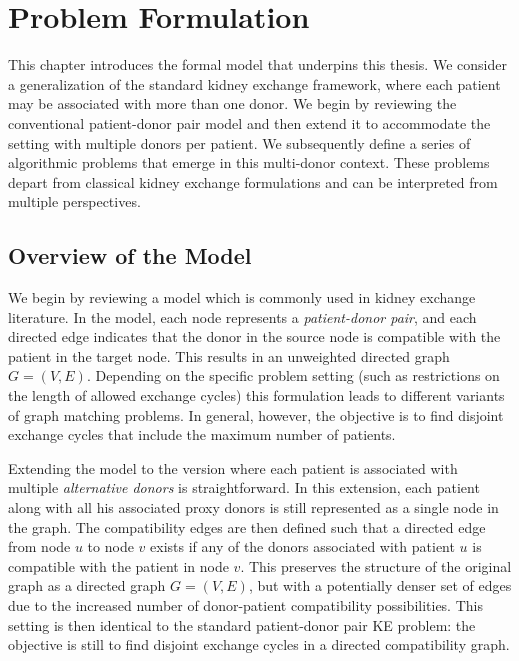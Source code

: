 \chapter{Problem Formulation}
\label{cha:problem_formulation}

This chapter introduces the formal model that underpins this thesis. We consider a generalization of the standard kidney exchange framework, where each patient may be associated with more than one donor. We begin by reviewing the conventional patient-donor pair model and then extend it to accommodate the setting with multiple donors per patient. We subsequently define a series of algorithmic problems that emerge in this multi-donor context. These problems depart from classical kidney exchange formulations and can be interpreted from multiple perspectives.%

\section{Overview of the Model}

We begin by reviewing a model which is commonly used in kidney exchange literature. In the model, each node represents a \textit{patient-donor pair}, and each directed edge indicates that the donor in the source node is compatible with the patient in the target node. This results in an unweighted directed graph $G = (V, E)$. Depending on the specific problem setting (such as restrictions on the length of allowed exchange cycles) this formulation leads to different variants of graph matching problems. In general, however, the objective is to find disjoint exchange cycles that include the maximum number of patients.

Extending the model to the version where each patient is associated with multiple \textit{alternative donors} is straightforward. In this extension, each patient along with all his associated proxy donors is still represented as a single node in the graph. The compatibility edges are then defined such that a directed edge from node $u$ to node $v$ exists if any of the donors associated with patient $u$ is compatible with the patient in node $v$. This preserves the structure of the original graph as a directed graph $G = (V, E)$, but with a potentially denser set of edges due to the increased number of donor-patient compatibility possibilities. This setting is then identical to the standard patient-donor pair KE problem: the objective is still to find disjoint exchange cycles in a directed compatibility graph.

